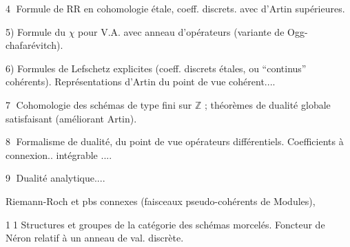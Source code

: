 \normalmarginpar
\textcircled{4} Formule de RR en cohomologie étale, coeff. discrets.
 avec  d'Artin supérieures.

5) Formule du $\chi$ pour V.A. avec anneau d'opérateurs (variante de Ogg-chafarévitch).

6) Formules de Lefschetz explicites (coeff. discrets étales, ou ``continus'' cohérents). Représentations d'Artin du point de vue cohérent....

\textcircled{7} Cohomologie des schémas de type fini sur $\mathbb{Z}$ ; théorèmes de dualité globale satisfaisant (améliorant Artin).

\textcircled{8} Formalisme de dualité, du point de vue opérateurs différentiels. Coefficients à connexion.. intégrable .... 

\textcircled{9} Dualité analytique....

Riemann-Roch et pbs connexes (faisceaux pseudo-cohérents de Modules),  

\textcircled{\small 11} Structures et groupes de la catégorie des schémas morcelés. Foncteur de Néron relatif à un anneau de val. discrète.


